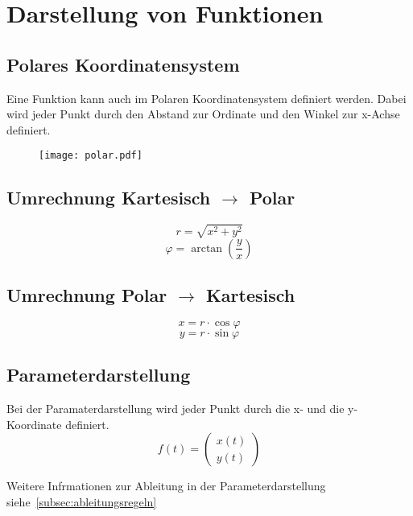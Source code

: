 



\section{Darstellung von Funktionen}
\subsection{Polares Koordinatensystem}
Eine Funktion kann auch im Polaren Koordinatensystem definiert werden. 
Dabei wird jeder Punkt durch den Abstand zur Ordinate und den Winkel zur x-Achse definiert. 

\begin{figure}[h!]
\texttt{[image: polar.pdf]}
\end{figure}


\subsection{Umrechnung Kartesisch $\rightarrow$ Polar}
\[ \boxed{r = \sqrt{x^2 + y^2}} \]
\[ \boxed{\varphi = \arctan\left(\frac{y}{x}\right)} \]

\subsection{Umrechnung Polar $\rightarrow$ Kartesisch}
\[ \boxed{x = r \cdot \cos{\varphi}} \]
\[ \boxed{y = r \cdot \sin{\varphi}} \]

\subsection{Parameterdarstellung}
Bei der Paramaterdarstellung wird jeder Punkt durch die x- und die y-Koordinate definiert. 
\[ \boxed{f(t) = \left(\begin{matrix} x(t)\\ y(t) \end{matrix}\right)} \] 

\noindent 
Weitere Infrmationen zur Ableitung in der Parameterdarstellung siehe~\ref{subsec:ableitungsregeln}
